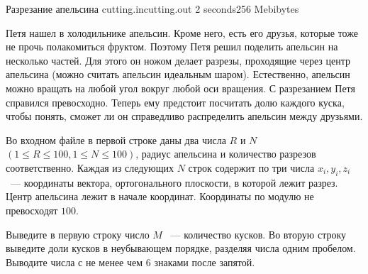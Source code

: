 \begin{problem}{Разрезание апельсина}
{cutting.in}{cutting.out}
{2 seconds}{256 Mebibytes}


Петя нашел в холодильнике апельсин. Кроме него, есть его друзья,
которые тоже не прочь полакомиться фруктом. Поэтому Петя решил
поделить апельсин на несколько частей. Для этого он ножом делает 
разрезы, проходящие через центр апельсина (можно считать апельсин 
идеальным шаром). Естественно, апельсин можно вращать на любой угол
вокруг любой оси вращения. С разрезанием Петя справился превосходно.
Теперь ему предстоит посчитать долю каждого куска, чтобы понять, 
сможет ли он справедливо распределить апельсин между друзьями.

\InputFile

Во входном файле в первой строке даны два числа $R$ и $N$ 
$(1\le R \le 100, 1 \le N \le 100)$,
радиус апельсина и количество разрезов соответственно. Каждая из 
следующих $N$ строк содержит по три числа $x_i, y_i, z_i$ ~---
координаты вектора, ортогонального плоскости, в которой лежит разрез.
Центр апельсина лежит в начале координат. Координаты по модулю не превосходят
$100$.

\OutputFile

Выведите в первую строку число $M$ ~--- количество кусков.
Во вторую строку выведите доли кусков в неубывающем порядке,
разделяя числа одним пробелом. Выводите числа с не менее чем $6$ знаками после запятой.

\Example

\begin{example}
%
\end{example}

\end{problem}
